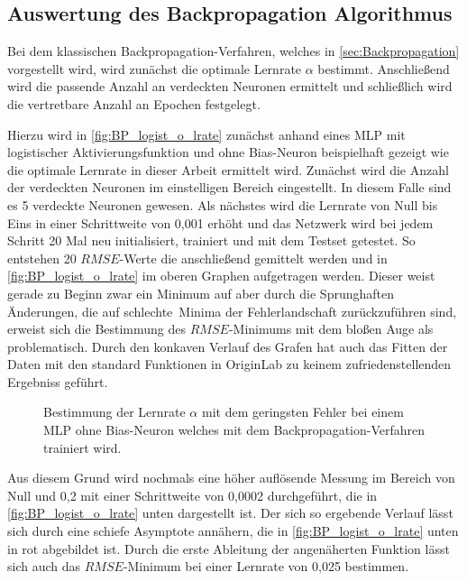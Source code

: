 \subsection{Auswertung des Backpropagation Algorithmus}\label{sec:aus_backprop}

Bei dem klassischen Backpropagation-Verfahren, welches in \autoref{sec:Backpropagation} vorgestellt wird, wird zunächst die optimale Lernrate $\alpha$ bestimmt. Anschließend wird die passende Anzahl an verdeckten Neuronen ermittelt und schließlich wird die vertretbare Anzahl an Epochen festgelegt.

Hierzu wird in \autoref{fig:BP_logist_o_lrate} zunächst anhand eines MLP mit logistischer Aktivierungsfunktion und ohne Bias-Neuron beispielhaft gezeigt wie die optimale Lernrate in dieser Arbeit ermittelt wird. Zunächst wird die Anzahl der verdeckten Neuronen im einstelligen Bereich eingestellt. In diesem Falle sind es 5 verdeckte Neuronen gewesen. Als nächstes wird die Lernrate von Null bis Eins in einer Schrittweite von 0,001 erhöht und das Netzwerk wird bei jedem Schritt 20 Mal neu initialisiert, trainiert und mit dem Testset getestet. So entstehen 20 $RMSE$-Werte die anschließend gemittelt werden und in \autoref{fig:BP_logist_o_lrate} im oberen Graphen aufgetragen werden. Dieser weist gerade zu Beginn zwar ein Minimum auf aber durch die Sprunghaften Änderungen, die auf \glqq schlechte\grqq~Minima der Fehlerlandschaft zurückzuführen sind, erweist sich die Bestimmung des $RMSE$-Minimums mit dem bloßen Auge als problematisch. Durch den konkaven Verlauf des Grafen hat auch das Fitten der Daten mit den standard Funktionen in OriginLab zu keinem zufriedenstellenden Ergebniss geführt.

\begin{figure}[!htb]
    \centering
        
    \caption{Bestimmung der Lernrate $\alpha$ mit dem geringsten Fehler bei einem MLP ohne Bias-Neuron welches mit dem Backpropagation-Verfahren trainiert wird.  }
    \label{fig:BP_logist_o_lrate}
\end{figure}

Aus diesem Grund wird nochmals eine höher auflösende Messung im Bereich von Null und 0,2 mit einer Schrittweite von 0,0002 durchgeführt, die in \autoref{fig:BP_logist_o_lrate} unten dargestellt ist. Der sich so ergebende Verlauf lässt sich durch eine schiefe Asymptote annähern, die in \autoref{fig:BP_logist_o_lrate} unten in rot abgebildet ist. Durch die erste Ableitung der angenäherten Funktion lässt sich auch das $RMSE$-Minimum bei einer Lernrate von 0,025 bestimmen.\\


